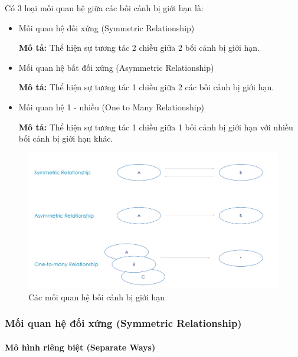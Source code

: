 Có 3 loại mối quan hệ giữa các bối cảnh bị giới hạn là:

\begin{itemize}

    \item Mối quan hệ đối xứng (Symmetric Relationship)

          \textbf{Mô tả:} Thể hiện sự tương tác 2 chiều giữa 2 bối cảnh bị giới hạn.

    \item Mối quan hệ bất đối xứng (Asymmetric Relationship)

          \textbf{Mô tả:} Thể hiện sự tương tác 1 chiều giữa 2 các bối cảnh bị giới hạn.

    \item Mối quan hệ 1 - nhiều (One to Many Relationship)

          \textbf{Mô tả:} Thể hiện sự tương tác 1 chiều giữa 1 bối cảnh bị giới hạn với nhiều bối cảnh bị giới hạn khác.

\end{itemize}

\begin{figure}[H]

    \centering

    \includegraphics[scale = 0.5]{pictures/cac_moi_quan_he_boi_canh_gioi_han/main.png}

    \caption{Các mối quan hệ bối cảnh bị giới hạn}

\end{figure}

\subsubsection{Mối quan hệ đối xứng (Symmetric Relationship)}

\paragraph{Mô hình riêng biệt (Separate Ways)}

